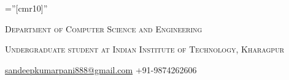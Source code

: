 \documentclass[a4paper,10pt]{article} %
\begin{document}
\pagestyle{empty} %

\font\fb=''[cmr10]'' %


\par{\bigskip\par} %
\par{\par}
\par{\centering\large {\textsc{Department of Computer Science and Engineering}}\par}\large
\par{\centering\large {\textsc{Undergraduate student at Indian Institute of Technology, Kharagpur}}\par}\large
\hspace{3.5cm}\normalsize {\href{mailto:sandeepkumarpani888@gmail.com}{sandeepkumarpani888@gmail.com}} \hfill {+91-9874262606}\hspace{3.5cm}

%

\end{document}
